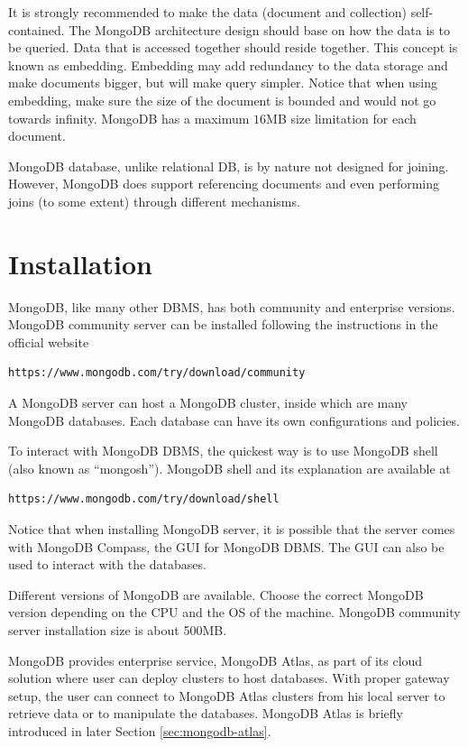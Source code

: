It is strongly recommended to make the data (document and collection) self-contained. The MongoDB architecture design should base on how the data is to be queried. Data that is accessed together should reside together. This concept is known as embedding. Embedding may add redundancy to the data storage and make documents bigger, but will make query simpler. Notice that when using embedding, make sure the size of the document is bounded and would not go towards infinity. MongoDB has a maximum $16$MB size limitation for each document.

MongoDB database, unlike relational DB, is by nature not designed for joining. However, MongoDB does support referencing documents and even performing joins (to some extent) through different mechanisms.

\section{Installation}

MongoDB, like many other DBMS, has both community and enterprise versions. MongoDB community server can be installed following the instructions in the official website
\begin{lstlisting}
https://www.mongodb.com/try/download/community
\end{lstlisting}
A MongoDB server can host a MongoDB cluster, inside which are many MongoDB databases. Each database can have its own configurations and policies.

To interact with MongoDB DBMS, the quickest way is to use MongoDB shell (also known as ``mongosh''). MongoDB shell and its explanation are available at
\begin{lstlisting}
https://www.mongodb.com/try/download/shell
\end{lstlisting}
Notice that when installing MongoDB server, it is possible that the server comes with MongoDB Compass, the GUI for MongoDB DBMS. The GUI can also be used to interact with the databases.

Different versions of MongoDB are available. Choose the correct MongoDB version depending on the CPU and the OS of the machine. MongoDB community server installation size is about 500MB.

MongoDB provides enterprise service, MongoDB Atlas, as part of its cloud solution where user can deploy clusters to host databases. With proper gateway setup, the user can connect to MongoDB Atlas clusters from his local server to retrieve data or to manipulate the databases. MongoDB Atlas is briefly introduced in later Section \ref{sec:mongodb-atlas}.

